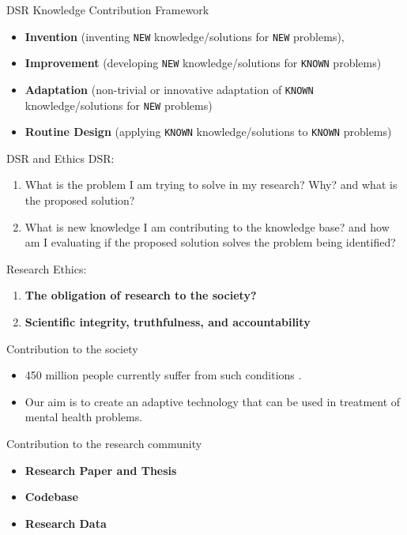 \documentclass[slidetop,mathserif,red]{beamer}
\begin{document}
\begin{frame}{DSR Knowledge Contribution Framework}
\begin{itemize}
    \item \textbf{Invention} (inventing \texttt{NEW} knowledge/solutions for \texttt{NEW} problems),
    \item \textbf{Improvement} (developing \texttt{NEW} knowledge/solutions for \texttt{KNOWN} problems)
    \item \textbf{Adaptation} (non-trivial or innovative adaptation of \texttt{KNOWN} knowledge/solutions for \texttt{NEW} problems)
    \item \textbf{Routine Design} (applying \texttt{KNOWN} knowledge/solutions to \texttt{KNOWN} problems)
\end{itemize}
\end{frame}

\begin{frame}{DSR and Ethics}
    DSR:
    \begin{enumerate}
        \item What is the problem I am trying to solve in my research? Why? and what is the proposed solution? 
        \item What is new knowledge I am contributing to the knowledge base? and how am I evaluating if the proposed solution solves the problem being identified? 
    \end{enumerate}
    
    Research Ethics:
    \begin{enumerate}
        \item \textbf{The obligation of research to the society? \cite{guidelines}}
        \item \textbf{Scientific integrity, truthfulness, and accountability}
    \end{enumerate}
\end{frame}

\begin{frame}{Contribution to the society}
    \begin{itemize}
        \item 450 million people currently suffer from such conditions \cite{b3}.
        \item Our aim is to create an adaptive technology that can be used in treatment of mental health problems. 
    \end{itemize}
\end{frame}

\begin{frame}{Contribution to the research community}
    \begin{itemize}
    \item \textbf{Research Paper and Thesis}
    \item \textbf{Codebase}
    \item \textbf{Research Data}
\end{itemize}
\end{frame}
\end{document}
